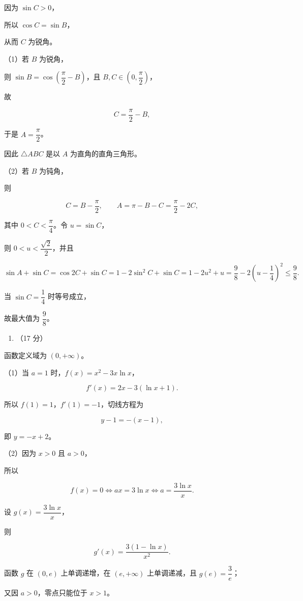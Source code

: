 \documentclass[UTF8,12pt,a4paper]{ctexart}
\renewcommand{\labelenumi}{\arabic{enumi}.}
\providecommand{\tightlist}{%
  \setlength{\itemsep}{0pt}\setlength{\parskip}{0pt}}
\begin{document}
因为 \(\sin C>0\)，

所以 \(\cos C=\sin B\)，

从而 \(C\) 为锐角。

（1）若 \(B\) 为锐角，

则 \(\sin B=\cos\left(\dfrac\pi2-B\right)\)，且 \(B,C\in\left(0,\dfrac\pi2\right)\)，

故

\[
   C=\frac\pi2-B,
   \]

于是 \(A=\dfrac\pi2\)。

因此 \(\triangle ABC\) 是以 \(A\) 为直角的直角三角形。

（2）若 \(B\) 为钝角，

则

\[
   C=B-\frac\pi2,
   \qquad
   A=\pi-B-C=\frac\pi2-2C,
   \]

其中 \(0<C<\dfrac\pi4\)。令 \(u=\sin C\)，

则 \(0<u<\dfrac{\sqrt2}{2}\)，并且

\[
   \sin A+\sin C=\cos2C+\sin C
   =1-2\sin^2C+\sin C
   =1-2u^2+u
   =\frac98-2\left(u-\frac14\right)^2\le\frac98.
   \]

当 \(\sin C=\dfrac14\) 时等号成立，

故最大值为 \(\dfrac98\)。

\begin{enumerate}
\def\labelenumi{\arabic{enumi}.}
\setcounter{enumi}{17}
\tightlist
\item
  （17 分）
\end{enumerate}

函数定义域为 \((0,+\infty)\)。

（1）当 \(a=1\) 时，\(f(x)=x^2-3x\ln x\)，

\[
   f'(x)=2x-3(\ln x+1).
   \]

所以 \(f(1)=1\)，\(f'(1)=-1\)，切线方程为

\[
   y-1=-(x-1),
   \]

即 \(y=-x+2\)。

（2）因为 \(x>0\) 且 \(a>0\)，

所以

\[
   f(x)=0\iff ax=3\ln x\iff a=\dfrac{3\ln x}{x}.
   \]

设 \(g(x)=\dfrac{3\ln x}{x}\)，

则

\[
   g'(x)=\dfrac{3(1-\ln x)}{x^2}.
   \]

函数 \(g\) 在 \((0,e)\) 上单调递增，在 \((e,+\infty)\) 上单调递减，且 \(g(e)=\dfrac3e\)；

又因 \(a>0\)，零点只能位于 \(x>1\)。
\end{document}

